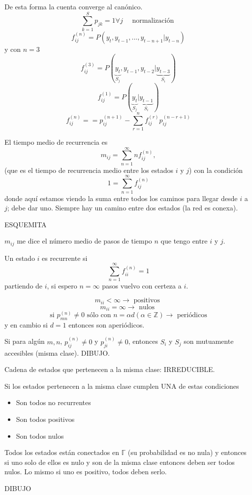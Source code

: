 \documentclass[10pt,oneside]{CBFT_book}
\begin{document}
De esta forma la cuenta converge al canónico.
\[
	\sum_{k=1}^S p_{jk} = 1 \forall j \quad \text{ normalización }
\]
\[
	f_{ij}^{(n)} = P( y_t, y_{t-1}, ..., y_{t-n+1} | y_{t-n} )
\]
y con $n=3$
\[
	f_{ij}^{(3)} = P( \underbrace{y_t}_{S_j}, y_{t-1}, y_{t-2} | \underbrace{y_{t-3}}_{S_i} )
\]
\[
	f_{ij}^{(1)} = P( \underbrace{y_t}_{S_j} | \underbrace{y_{t-1}}_{S_i} )
\]
\[
	f_{ij}^{(n)} = = p_{ij}^{(n+1)} - \sum_{r=1}^n f_{ij}^{(r)} p_{ij}^{(n-r+1)}
\]

El tiempo medio de recurrencia es
\[
	m_{ij} = \sum_{n=1}^\infty n f_{ij}^{(n)}, 
\]
(que es el tiempo de recurrencia medio entre los estados $i$ y $j$) con la condición 
\[	
	1 = \sum_{n=1}^\infty f_{ij}^{(n)}
\]
donde aquí estamos viendo la suma entre todos los caminos para llegar desde $i$ a $j$; debe dar uno.
Siempre hay un camino entre dos estados (la red es conexa).

ESQUEMITA

$m_{ij}$ me dice el número medio de pasos de tiempo $n$ que tengo entre $i$ y $j$.

Un estado $i$ es recurrente si 
\[
	\sum_{n=1}^\infty f_{ii}^{(n)} = 1
\]
partiendo de $i$, si espero $n=\infty$ pasos vuelvo con certeza a $i$.

\[
	m_{ii} < \infty \rightarrow \text{ positivos }
\]
\[
	m_{ii} = \infty \rightarrow \text{ nulos }
\]
\[
	\text{ si } p_{mn}^{(n)} \neq 0 \text{ sólo con } n=\alpha d (\alpha \in \mathbb{Z}) \rightarrow 
	\text{ periódicos } 
\]
y en cambio si $d=1$ entonces son aperiódicos.

Si para algún $m,n$, $p_{ij}^{(n)} \neq 0$ y $p_{ji}^{(n)} \neq 0$, entonces $S_i$ y $S_j$ son mutuamente accesibles 
(misma clase). DIBUJO.

Cadena de estados que pertenecen a la misma clase: IRREDUCIBLE.

Si los estados pertenecen a la misma clase cumplen UNA de estas condiciones 
\begin{itemize}
 \item Son todos no recurrentes
 \item Son todos positivos
 \item Son todos nulos
\end{itemize}

Todos los estados están conectados en $ \mathbb{\Gamma} $  (su probabilidad es no nula) y entonces
si uno solo de ellos es nulo y son de la misma clase entonces deben ser todos nulos.
Lo mismo si uno es positivo, todos deben serlo.

DIBUJO 
\end{document}
